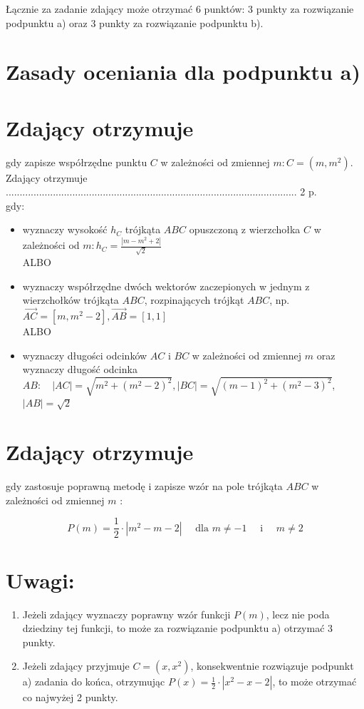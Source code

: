\documentclass[10pt]{article}
\begin{document}
Łącznie za zadanie zdający może otrzymać 6 punktów: 3 punkty za rozwiązanie podpunktu a) oraz 3 punkty za rozwiązanie podpunktu b).

\section*{Zasady oceniania dla podpunktu a)}
\section*{Zdający otrzymuje}
gdy zapisze współrzędne punktu $C$ w zależności od zmiennej $m: C=\left(m, m^{2}\right)$.\\
Zdający otrzymuje ......................................................................................................... 2 p.\\
gdy:

\begin{itemize}
  \item wyznaczy wysokość $h_{C}$ trójkąta $A B C$ opuszczoną z wierzchołka $C$ w zależności od $m: h_{C}=\frac{\left|m-m^{2}+2\right|}{\sqrt{2}}$\\
ALBO
  \item wyznaczy współrzędne dwóch wektorów zaczepionych w jednym z wierzchołków trójkąta $A B C$, rozpinających trójkąt $A B C$, np. $\overrightarrow{A C}=\left[m, m^{2}-2\right], \overrightarrow{A B}=[1,1]$\\
ALBO
  \item wyznaczy długości odcinków $A C$ i $B C$ w zależności od zmiennej $m$ oraz wyznaczy długość odcinka $A B: \quad|A C|=\sqrt{m^{2}+\left(m^{2}-2\right)^{2}},|B C|=\sqrt{(m-1)^{2}+\left(m^{2}-3\right)^{2}}$, $|A B|=\sqrt{2}$
\end{itemize}

\section*{Zdający otrzymuje}
gdy zastosuje poprawną metodę i zapisze wzór na pole trójkąta $A B C$ w zależności od zmiennej $m$ :

$$
P(m)=\frac{1}{2} \cdot\left|m^{2}-m-2\right| \quad \text { dla } m \neq-1 \quad \text { i } \quad m \neq 2
$$

\section*{Uwagi:}
\begin{enumerate}
  \item Jeżeli zdający wyznaczy poprawny wzór funkcji $P(m)$, lecz nie poda dziedziny tej funkcji, to może za rozwiązanie podpunktu a) otrzymać 3 punkty.
  \item Jeżeli zdający przyjmuje $C=\left(x, x^{2}\right)$, konsekwentnie rozwiązuje podpunkt a) zadania do końca, otrzymując $P(x)=\frac{1}{2} \cdot\left|x^{2}-x-2\right|$, to może otrzymać co najwyżej 2 punkty.
\end{enumerate}
\end{document}

